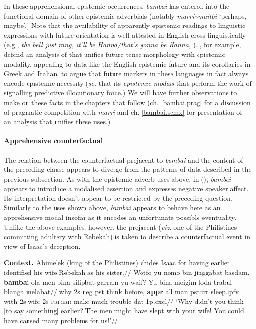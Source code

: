 \noindent In these apprehensional-epistemic occurrences, \textit{bambai} has entered into the functional domain of other epistemic adverbials (notably \textit{marri\textasciitilde{maitbi}} `perhaps, maybe'.) Note that the availability of apparently epistemic readings to linguistic expressions with future-orientation is well-attested in English cross-linguistically (e.g., \textit{the bell just rang, it'll be Hanna/that's gonna be Hanna}, \citealp[see also][]{Condoravdi2003,Winans2016,Werner2006}). \citet{Giannakidou2018}, for example, defend an analysis of that unifies future tense morphology with epistemic modality, appealing to data like the English epistemic future and its corollaries in Greek and Italian, to argue that future markers in these languages in fact always encode epistemic necessity (\textit{sc.} that its \textit{epistemic modals} that perform the work of signalling predictive illocutionary force.) We will have further observations to make on these facts in the chapters that follow (ch. \ref{bambai.prag} for a discussion of pragmatic competition with \textit{marri} and ch. \ref{bambai.semx} for presentation of an analysis that unifies these uses.)

\paragraph[Counterfactual]{Apprehensive counterfactual}

The relation between the counterfactual prejacent to \textit{bambai} and the content of the preceding clause appears to diverge from the patterns of data described in the previous subsection. As with the epistemic adverb uses above, in (), \textit{bambai} appears to introduce a modalised assertion and expresses negative speaker affect. Its interpretation doesn't appear to be restricted by the preceding question. Similarly to the uses shown above, \textit{bambai} appears to behave here as an apprehensive modal insofar as it encodes an unfortunate possible eventuality. Unlike the above examples, however, the prejacent (\textit{viz.} one of the Philistines committing adultery with Rebekah) is taken to describe a counterfactual event in view of Isaac's deception.

\pex\begingl{}\glpreamble\textbf{Context.} Abimelek (king of the Philistines) chides Isaac for having earlier identified his wife Rebekah as his sister.//
 \gla Wotfo yu nomo bin jinggabat basdam, \textbf{bambai} ola men bina silipbat garram yu waif? Yu bina meigim loda trabul blanga melabat//
\glb why 2s \gls{neg} \gls{pst} think before, \textbf{\gls{appr}} all man \gls{pst}:\gls{irr} sleep.\gls{ipfv} with 2s wife 2s \textsc{pst:irr} make much trouble \gls{dat} 1p.\gls{excl}//
\glft`Why didn't you think [to say something] earlier? The men might have slept with your wife! You could have caused many problems for us!'\trailingcitation{[KB~Jen 26.10]}//\endgl
\xe



